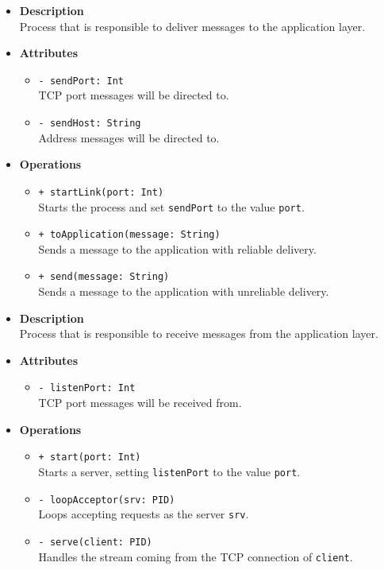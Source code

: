 \FloatBarrier
\begin{itemize}
  \item \textbf{Description} \\
    Process that is responsible to deliver messages to the application layer.
  \item \textbf{Attributes}
    \begin{itemize}
      \item \texttt{- sendPort: Int} \\
    TCP port messages will be directed to.
      \item \texttt{- sendHost: String} \\
    Address messages will be directed to.
    \end{itemize}
  \item \textbf{Operations}
  \begin{itemize}
    \item \texttt{+ startLink(port: Int)} \\
    Starts the process and set \texttt{sendPort} to the value \texttt{port}.
    \item \texttt{+ toApplication(message: String)} \\
    Sends a message to the application with reliable delivery.
    \item \texttt{+ send(message: String)} \\
    Sends a message to the application with unreliable delivery.
  \end{itemize}
\end{itemize}

\FloatBarrier
\begin{itemize}
  \item \textbf{Description} \\
    Process that is responsible to receive messages from the application layer.
  \item \textbf{Attributes}
    \begin{itemize}
      \item \texttt{- listenPort: Int} \\
    TCP port messages will be received from.
    \end{itemize}
  \item \textbf{Operations}
  \begin{itemize}
    \item \texttt{+ start(port: Int)} \\
    Starts a server, setting \texttt{listenPort} to the value \texttt{port}.
    \item \texttt{- loopAcceptor(srv: PID)} \\
    Loops accepting requests as the server \texttt{srv}.
    \item \texttt{- serve(client: PID)} \\
    Handles the stream coming from the TCP connection of \texttt{client}.
  \end{itemize}
\end{itemize}

